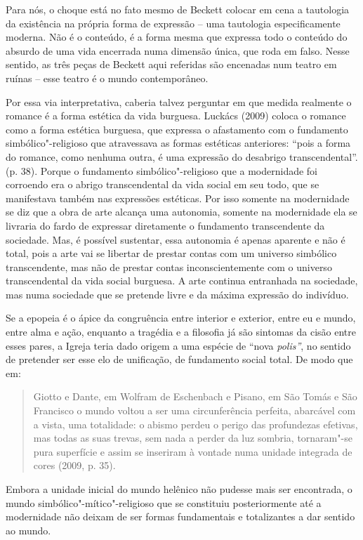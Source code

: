 Para nós, o choque está no fato mesmo de Beckett colocar em cena a
tautologia da existência na própria forma de expressão -- uma tautologia
especificamente moderna. Não é o conteúdo, é a forma mesma que expressa
todo o conteúdo do absurdo de uma vida encerrada numa dimensão única,
que roda em falso. Nesse sentido, as três peças de Beckett aqui
referidas são encenadas num teatro em ruínas -- esse teatro é o mundo
contemporâneo.

Por essa via interpretativa, caberia talvez perguntar em que medida
realmente o romance é a forma estética da vida burguesa. Luckács (2009)
coloca o romance como a forma estética burguesa, que expressa o
afastamento com o fundamento simbólico"-religioso que atravessava as
formas estéticas anteriores: ``pois a forma do romance, como nenhuma
outra, é uma expressão do desabrigo transcendental''. (p. 38). Porque o
fundamento simbólico"-religioso que a modernidade foi corroendo era o
abrigo transcendental da vida social em seu todo, que se manifestava
também nas expressões estéticas. Por isso somente na modernidade se diz
que a obra de arte alcança uma autonomia, somente na modernidade ela se
livraria do fardo de expressar diretamente o fundamento transcendente da
sociedade. Mas, é possível sustentar, essa autonomia é apenas aparente e
não é total, pois a arte vai se libertar de prestar contas com um
universo simbólico transcendente, mas não de prestar contas
inconscientemente com o universo transcendental da vida social burguesa.
A arte continua entranhada na sociedade, mas numa sociedade que se
pretende livre e da máxima expressão do indivíduo.

Se a epopeia é o ápice da congruência entre interior e exterior, entre
eu e mundo, entre alma e ação, enquanto a tragédia e a filosofia já são
sintomas da cisão entre esses pares, a Igreja teria dado origem a uma
espécie de ``nova \emph{polis''}, no sentido de pretender ser esse elo
de unificação, de fundamento social total. De modo que em:

\begin{quote}
Giotto e Dante, em Wolfram de Eschenbach e Pisano, em São Tomás e São
Francisco o mundo voltou a ser uma circunferência perfeita, abarcável
com a vista, uma totalidade: o abismo perdeu o perigo das profundezas
efetivas, mas todas as suas trevas, sem nada a perder da luz sombria,
tornaram"-se pura superfície e assim se inseriram à vontade numa unidade
integrada de cores (2009, p. 35).
\end{quote}

Embora a unidade inicial do mundo helênico não pudesse mais ser
encontrada, o mundo simbólico"-mítico"-religioso que se constituiu
posteriormente até a modernidade não deixam de ser formas fundamentais e
totalizantes a dar sentido ao mundo.

